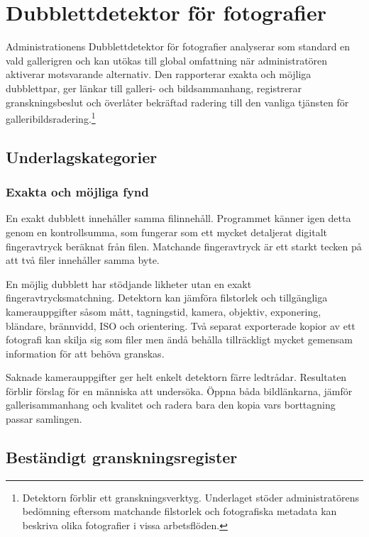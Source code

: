 \documentclass[11pt,a4paper]{article}
\begin{document}
\section{Dubblettdetektor för fotografier}
\label{sec:duplicates}

Administrationens Dubblettdetektor för fotografier analyserar som standard en
vald gallerigren och kan utökas till global omfattning när administratören
aktiverar motsvarande alternativ. Den rapporterar exakta och möjliga
dubblettpar, ger länkar till galleri- och bildsammanhang, registrerar
granskningsbeslut och överlåter bekräftad radering till den vanliga tjänsten för
galleribildsradering.\footnote{Detektorn förblir ett granskningsverktyg.
Underlaget stöder administratörens bedömning eftersom matchande filstorlek och
fotografiska metadata kan beskriva olika fotografier i vissa arbetsflöden.}

\subsection{Underlagskategorier}

\subsubsection{Exakta och möjliga fynd}

En exakt dubblett innehåller samma filinnehåll. Programmet känner igen detta
genom en kontrollsumma, som fungerar som ett mycket detaljerat digitalt
fingeravtryck beräknat från filen. Matchande fingeravtryck är ett starkt tecken
på att två filer innehåller samma byte.

En möjlig dubblett har stödjande likheter utan en exakt fingeravtrycksmatchning.
Detektorn kan jämföra filstorlek och tillgängliga kamerauppgifter såsom mått,
tagningstid, kamera, objektiv, exponering, bländare, brännvidd, ISO och
orientering. Två separat exporterade kopior av ett fotografi kan skilja sig som
filer men ändå behålla tillräckligt mycket gemensam information för att behöva
granskas.

Saknade kamerauppgifter ger helt enkelt detektorn färre ledtrådar. Resultaten
förblir förslag för en människa att undersöka. Öppna båda bildlänkarna, jämför
gallerisammanhang och kvalitet och radera bara den kopia vars borttagning passar
samlingen.

\subsection{Beständigt granskningsregister}
\end{document}
